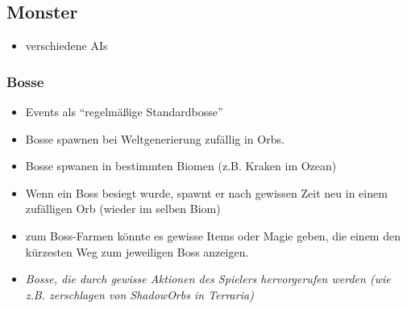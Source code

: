 \subsection{Monster}
\label{subsec:monster}
	\begin{itemize}
		\item verschiedene AIs
	\end{itemize}

\subsubsection{Bosse}
\label{subsubsec:bosse}
	\begin{itemize}
		\item Events als ``regelmäßige Standardbosse''
		\item Bosse spawnen bei Weltgenerierung zufällig in Orbs.
		\item Bosse spwanen in bestimmten Biomen (z.B. Kraken im Ozean)
		\item Wenn ein Boss besiegt wurde, spawnt er nach gewissen Zeit neu in einem zufälligen Orb (wieder im selben Biom)
		\item zum Boss-Farmen könnte es gewisse Items oder Magie geben, die einem den kürzesten Weg zum jeweiligen Boss anzeigen.
		\item \textit{Bosse, die durch gewisse Aktionen des Spielers hervorgerufen werden (wie z.B. zerschlagen von ShadowOrbs in Terraria)}
	\end{itemize}